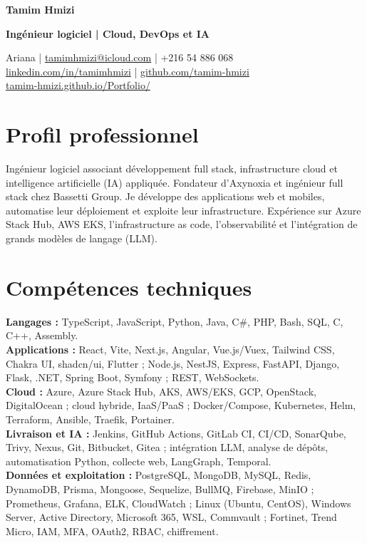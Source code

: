 \documentclass[11pt,a4paper]{article}
\begin{document}
{\fontsize{25}{28}\selectfont\textbf{\color{accent}Tamim Hmizi}}\par
{\large\textbf{Ingénieur logiciel | Cloud, DevOps et IA}}\par
Ariana | \href{mailto:tamimhmizi@icloud.com}{tamimhmizi@icloud.com} | +216 54 886 068\\
\href{https://www.linkedin.com/in/tamimhmizi/}{linkedin.com/in/tamimhmizi} | \href{https://github.com/tamim-hmizi}{github.com/tamim-hmizi}\\
\href{https://tamim-hmizi.github.io/Portfolio/}{tamim-hmizi.github.io/Portfolio/}

\section{Profil professionnel}
Ingénieur logiciel associant développement full stack, infrastructure cloud et intelligence artificielle (IA) appliquée. Fondateur d'Axynoxia et ingénieur full stack chez Bassetti Group. Je développe des applications web et mobiles, automatise leur déploiement et exploite leur infrastructure. Expérience sur Azure Stack Hub, AWS EKS, l'infrastructure as code, l'observabilité et l'intégration de grands modèles de langage (LLM).

\section{Compétences techniques}
\textbf{Langages :} TypeScript, JavaScript, Python, Java, C\#, PHP, Bash, SQL, C, C++, Assembly.\\
\textbf{Applications :} React, Vite, Next.js, Angular, Vue.js/Vuex, Tailwind CSS, Chakra UI, shadcn/ui, Flutter ; Node.js, NestJS, Express, FastAPI, Django, Flask, .NET, Spring Boot, Symfony ; REST, WebSockets.\\
\textbf{Cloud :} Azure, Azure Stack Hub, AKS, AWS/EKS, GCP, OpenStack, DigitalOcean ; cloud hybride, IaaS/PaaS ; Docker/Compose, Kubernetes, Helm, Terraform, Ansible, Traefik, Portainer.\\
\textbf{Livraison et IA :} Jenkins, GitHub Actions, GitLab CI, CI/CD, SonarQube, Trivy, Nexus, Git, Bitbucket, Gitea ; intégration LLM, analyse de dépôts, automatisation Python, collecte web, LangGraph, Temporal.\\
\textbf{Données et exploitation :} PostgreSQL, MongoDB, MySQL, Redis, DynamoDB, Prisma, Mongoose, Sequelize, BullMQ, Firebase, MinIO ; Prometheus, Grafana, ELK, CloudWatch ; Linux (Ubuntu, CentOS), Windows Server, Active Directory, Microsoft 365, WSL, Commvault ; Fortinet, Trend Micro, IAM, MFA, OAuth2, RBAC, chiffrement.
\end{document}
